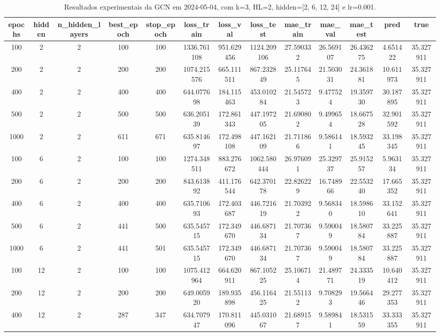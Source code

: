 \begin{table}[h]
\centering
\caption{Resultados experimentais da GCN em 2024-05-04, com k=3, HL=2, hidden=[2, 6, 12, 24] e lr=0.001.}
\label{tab:gcn_results_k3_hl2_d20240504}
\begin{tabular}{ccccccccccccc}
\toprule
epochs & hidden & n\_hidden\_layers & best\_epoch & stop\_epoch & loss\_train & loss\_val & loss\_test & mae\_train & mae\_val & mae\_test & pred & true \\
\midrule
100 & 2 & 2 & 100 & 100 & 1336.761108 & 951.629456 & 1124.209106 & 27.590332 & 26.569107 & 26.436275 & 4.651422 & 35.327911 \\
200 & 2 & 2 & 200 & 200 & 1074.215576 & 665.111511 & 867.232849 & 25.117645 & 21.503031 & 24.361881 & 10.611973 & 35.327911 \\
400 & 2 & 2 & 400 & 400 & 644.077698 & 184.115463 & 453.010284 & 21.545723 & 9.477524 & 19.359730 & 30.187895 & 35.327911 \\
500 & 2 & 2 & 500 & 500 & 636.205139 & 172.861343 & 447.197205 & 21.690802 & 9.499654 & 18.667528 & 32.901592 & 35.327911 \\
1000 & 2 & 2 & 611 & 671 & 635.814697 & 172.498108 & 447.162109 & 21.711866 & 9.586141 & 18.593245 & 33.198345 & 35.327911 \\
100 & 6 & 2 & 100 & 100 & 1274.348511 & 883.276672 & 1062.580444 & 26.976091 & 25.329737 & 25.915257 & 5.963134 & 35.327911 \\
200 & 6 & 2 & 200 & 200 & 843.613892 & 411.176544 & 642.370178 & 22.826229 & 16.748966 & 22.553240 & 17.665352 & 35.327911 \\
400 & 6 & 2 & 400 & 400 & 635.710693 & 172.403687 & 446.721619 & 21.703922 & 9.568340 & 18.598610 & 33.152641 & 35.327911 \\
500 & 6 & 2 & 441 & 500 & 635.545715 & 172.349670 & 446.687134 & 21.707367 & 9.590049 & 18.580784 & 33.225887 & 35.327911 \\
1000 & 6 & 2 & 441 & 501 & 635.545715 & 172.349670 & 446.687134 & 21.707367 & 9.590049 & 18.580784 & 33.225887 & 35.327911 \\
100 & 12 & 2 & 100 & 100 & 1075.412964 & 664.620911 & 867.105225 & 25.106714 & 21.489771 & 24.333519 & 10.640412 & 35.327911 \\
200 & 12 & 2 & 200 & 200 & 649.005920 & 189.935898 & 456.116425 & 21.551132 & 9.708293 & 19.566446 & 29.277353 & 35.327911 \\
400 & 12 & 2 & 287 & 347 & 634.707947 & 170.811096 & 445.031067 & 21.689157 & 9.589841 & 18.531559 & 33.333355 & 35.327911 \\

\end{tabular}
\end{table}
